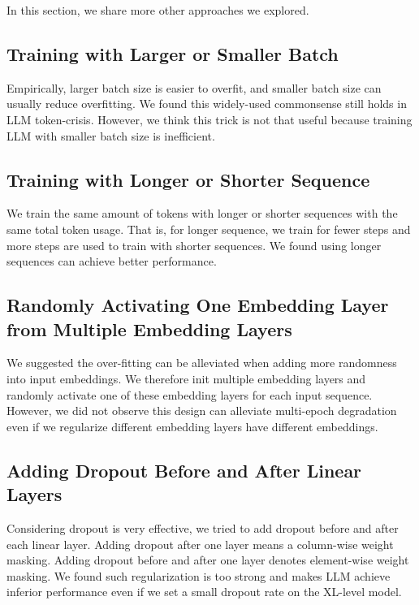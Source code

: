\documentclass{article}
\def\revise{\textcolor{red}}
\begin{document}
In this section, we share more other approaches we explored.

\subsection{Training with Larger or Smaller Batch}

Empirically, larger batch size is easier to overfit, and smaller batch size can usually reduce overfitting. We found this widely-used commonsense still holds in LLM token-crisis. However, we think this trick is not that useful because training LLM with smaller batch size is inefficient.



\subsection{Training with Longer or Shorter Sequence}

We train the same amount of tokens with longer or shorter sequences with the same total token usage. That is, for longer sequence, we train for fewer steps and more steps are used to train with shorter sequences. We found using longer sequences can achieve better performance.


\subsection{Randomly Activating One Embedding Layer from Multiple Embedding Layers}

We suggested the over-fitting can be alleviated when adding more randomness into input embeddings. We therefore init multiple embedding layers and randomly activate one of these embedding layers for each input sequence. However, we did not observe this design can alleviate multi-epoch degradation even if we regularize different embedding layers have different embeddings. 

\subsection{Adding Dropout Before and After Linear Layers}

Considering dropout is very effective, we tried to add dropout before and after each linear layer. Adding dropout after one layer means a column-wise weight masking. Adding dropout before and after one layer denotes element-wise weight masking. We found such regularization is too strong and makes LLM achieve inferior performance even if we set a small dropout rate on the XL-level model.
\end{document}
